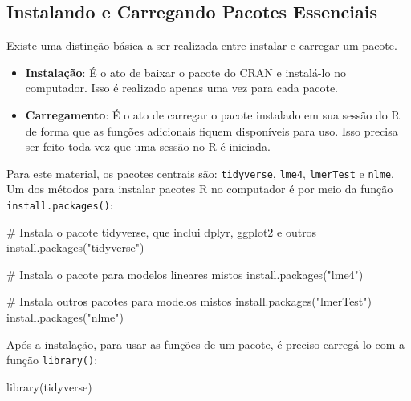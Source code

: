 \documentclass[
  12pt,
  letterpaper,
  DIV=11,
  numbers=noendperiod]{scrreprt}
\newenvironment{Shaded}{\begin{snugshade}}{\end{snugshade}}
\newcommand{\CommentTok}[1]{\textcolor[rgb]{0.37,0.37,0.37}{#1}}
\newcommand{\FunctionTok}[1]{\textcolor[rgb]{0.28,0.35,0.67}{#1}}
\newcommand{\NormalTok}[1]{\textcolor[rgb]{0.00,0.23,0.31}{#1}}
\newcommand{\StringTok}[1]{\textcolor[rgb]{0.13,0.47,0.30}{#1}}
\providecommand{\tightlist}{%
  \setlength{\itemsep}{0pt}\setlength{\parskip}{0pt}}\usepackage{longtable,booktabs,array}
\begin{document}
\subsection{Instalando e Carregando Pacotes
Essenciais}\label{instalando-e-carregando-pacotes-essenciais}

Existe uma distinção básica a ser realizada entre instalar e carregar um
pacote.

\begin{itemize}
\tightlist
\item
  \textbf{Instalação}: É o ato de baixar o pacote do CRAN e instalá-lo
  no computador. Isso é realizado apenas uma vez para cada pacote.
\item
  \textbf{Carregamento}: É o ato de carregar o pacote instalado em sua
  sessão do R de forma que as funções adicionais fiquem disponíveis para
  uso. Isso precisa ser feito toda vez que uma sessão no R é iniciada.
\end{itemize}

Para este material, os pacotes centrais são: \texttt{tidyverse},
\texttt{lme4}, \texttt{lmerTest} e \texttt{nlme}. Um dos métodos para
instalar pacotes R no computador é por meio da função
\texttt{install.packages()}:

\begin{Shaded}
\begin{Highlighting}[]
\CommentTok{\# Instala o pacote tidyverse, que inclui dplyr, ggplot2 e outros}
\FunctionTok{install.packages}\NormalTok{(}\StringTok{"tidyverse"}\NormalTok{)}

\CommentTok{\# Instala o pacote para modelos lineares mistos}
\FunctionTok{install.packages}\NormalTok{(}\StringTok{"lme4"}\NormalTok{)}

\CommentTok{\# Instala outros pacotes para modelos mistos}
\FunctionTok{install.packages}\NormalTok{(}\StringTok{"lmerTest"}\NormalTok{)}
\FunctionTok{install.packages}\NormalTok{(}\StringTok{"nlme"}\NormalTok{)}
\end{Highlighting}
\end{Shaded}

Após a instalação, para usar as funções de um pacote, é preciso
carregá-lo com a função \texttt{library()}:

\begin{Shaded}
\begin{Highlighting}[]
\FunctionTok{library}\NormalTok{(tidyverse)}
\end{Highlighting}
\end{Shaded}
\end{document}
